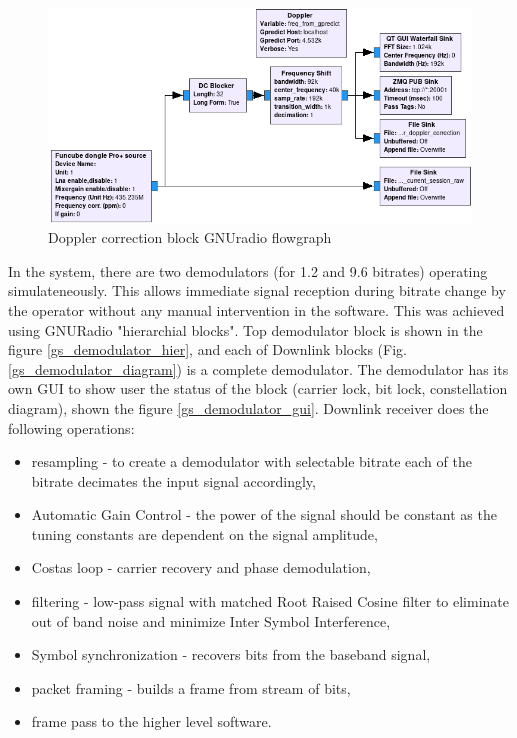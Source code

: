 \begin{figure}
    \centering
    \includegraphics[width=0.7\paperwidth]{img/7/gs_doppler_gnuradio.png}
    \caption{Doppler correction block GNUradio flowgraph}
    \label{gs_doppler_gnuradio}
\end{figure}

In the system, there are two demodulators (for \SI{1.2}{\kbps} and \SI{9.6}{\kbps} bitrates) operating simulateneously. This allows immediate signal reception during bitrate change by the operator without any manual intervention in the software. This was achieved using GNURadio "hierarchial blocks". Top demodulator block is shown in the figure \ref{gs_demodulator_hier}, and each of Downlink blocks (Fig. \ref{gs_demodulator_diagram}) is a complete demodulator. The demodulator has its own GUI to show user the status of the block (carrier lock, bit lock, constellation diagram), shown the figure \ref{gs_demodulator_gui}.
Downlink receiver does the following operations:
\begin{itemize}
    \item resampling - to create a demodulator with selectable bitrate each of the bitrate decimates the input signal accordingly,
    \item Automatic Gain Control - the power of the signal should be constant as the tuning constants are dependent on the signal amplitude,
    \item Costas loop - carrier recovery and phase demodulation,
    \item filtering - low-pass signal with matched Root Raised Cosine filter to eliminate out of band noise and minimize Inter Symbol Interference,
    \item Symbol synchronization - recovers bits from the baseband signal,
    \item packet framing - builds a frame from stream of bits,
    \item frame pass to the higher level software.
\end{itemize}

